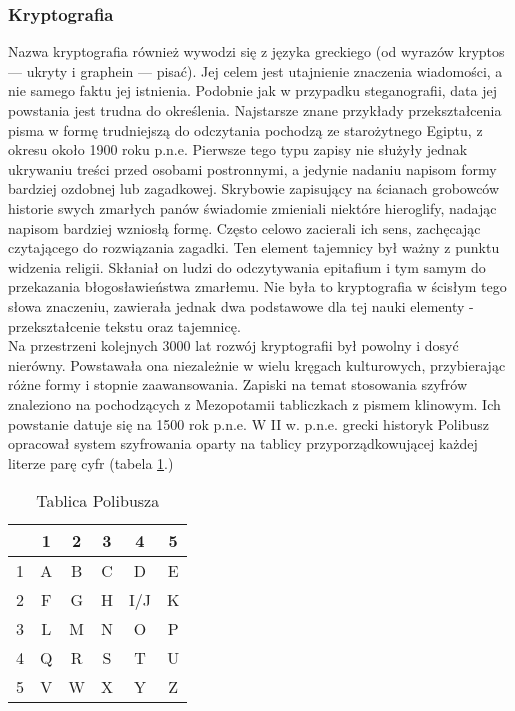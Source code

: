 \documentclass[10pt, a4paper, titlepage]{article}
\begin{document}
\subsubsection{Kryptografia}
Nazwa kryptografia również wywodzi się z języka greckiego (od wyrazów kryptos — ukryty i graphein — pisać). Jej celem jest utajnienie znaczenia wiadomości, a nie samego faktu jej istnienia. Podobnie jak w przypadku steganografii, data jej powstania jest trudna do określenia. Najstarsze znane przykłady przekształcenia pisma w formę trudniejszą do odczytania pochodzą ze starożytnego Egiptu, z okresu około 1900 roku p.n.e. Pierwsze tego typu zapisy nie służyły jednak ukrywaniu treści przed osobami postronnymi, a jedynie nadaniu napisom formy bardziej ozdobnej lub zagadkowej. Skrybowie zapisujący na ścianach grobowców historie swych zmarłych panów świadomie zmieniali niektóre hieroglify, nadając napisom bardziej wzniosłą formę. Często celowo zacierali ich sens, zachęcając czytającego do rozwiązania zagadki. Ten element tajemnicy był ważny z punktu widzenia religii. Skłaniał on ludzi do odczytywania epitafium i tym samym do przekazania błogosławieństwa zmarłemu. Nie była to kryptografia w ścisłym tego słowa znaczeniu, zawierała jednak dwa podstawowe dla tej nauki elementy - przekształcenie tekstu oraz tajemnicę.\\
Na przestrzeni kolejnych 3000 lat rozwój kryptografii był powolny i dosyć nierówny. Powstawała ona niezależnie w wielu kręgach kulturowych, przybierając różne formy i stopnie zaawansowania. Zapiski na temat stosowania szyfrów znaleziono na pochodzących z Mezopotamii tabliczkach z pismem klinowym. Ich powstanie datuje się na 1500 rok p.n.e. W II w. p.n.e. grecki historyk Polibusz opracował system szyfrowania oparty na tablicy przyporządkowującej każdej literze parę cyfr (tabela \ref{tabela 1}.)
\begin{table}[h]
\centering\caption{Tablica Polibusza}\label{tabela 1}
\begin{tabular}{| c |  c | c | c | c | c |}
\hline
& 1 & 2 & 3 & 4 & 5 \\
\hline
1 & A & B & C & D & E \\
\hline
2 & F & G & H & I/J & K \\
\hline
3 & L & M & N & O & P \\
\hline
4 & Q & R & S & T & U \\
\hline
5 & V & W & X & Y & Z \\
\hline
\end{tabular}
\end{table}
\\
\end{document}
